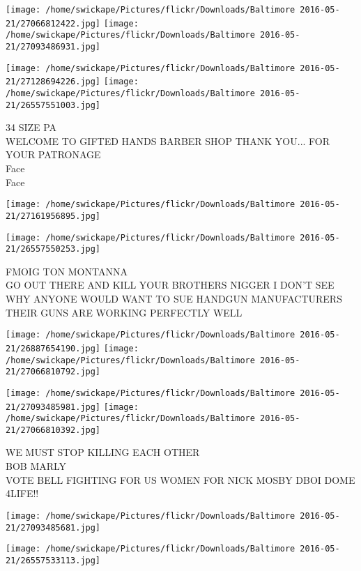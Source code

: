 \documentclass[10pt,letterpaper]{article}
\begin{document}
\texttt{[image: /home/swickape/Pictures/flickr/Downloads/Baltimore 2016-05-21/27066812422.jpg]}
\texttt{[image: /home/swickape/Pictures/flickr/Downloads/Baltimore 2016-05-21/27093486931.jpg]}

\texttt{[image: /home/swickape/Pictures/flickr/Downloads/Baltimore 2016-05-21/27128694226.jpg]}
\texttt{[image: /home/swickape/Pictures/flickr/Downloads/Baltimore 2016-05-21/26557551003.jpg]}

34 SIZE PA\\
WELCOME TO GIFTED HANDS BARBER SHOP THANK YOU... FOR YOUR PATRONAGE\\
Face\\
Face
\pagebreak

\texttt{[image: /home/swickape/Pictures/flickr/Downloads/Baltimore 2016-05-21/27161956895.jpg]}

\vspace{0.25in}
\texttt{[image: /home/swickape/Pictures/flickr/Downloads/Baltimore 2016-05-21/26557550253.jpg]}

FMOIG TON MONTANNA\\
GO OUT THERE AND KILL YOUR BROTHERS NIGGER I DON'T SEE WHY ANYONE WOULD WANT TO SUE HANDGUN MANUFACTURERS THEIR GUNS ARE WORKING PERFECTLY WELL
\pagebreak

\texttt{[image: /home/swickape/Pictures/flickr/Downloads/Baltimore 2016-05-21/26887654190.jpg]}
\texttt{[image: /home/swickape/Pictures/flickr/Downloads/Baltimore 2016-05-21/27066810792.jpg]}

\texttt{[image: /home/swickape/Pictures/flickr/Downloads/Baltimore 2016-05-21/27093485981.jpg]}
\texttt{[image: /home/swickape/Pictures/flickr/Downloads/Baltimore 2016-05-21/27066810392.jpg]}

WE MUST STOP KILLING EACH OTHER\\
BOB MARLY\\
VOTE BELL FIGHTING FOR US WOMEN FOR NICK MOSBY DBOI DOME\\
4LIFE!!
\pagebreak

\texttt{[image: /home/swickape/Pictures/flickr/Downloads/Baltimore 2016-05-21/27093485681.jpg]}

\vspace{0.25in}
\texttt{[image: /home/swickape/Pictures/flickr/Downloads/Baltimore 2016-05-21/26557533113.jpg]}
\end{document}
